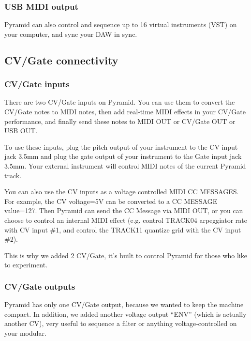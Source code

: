 \subsubsection{USB MIDI output}


Pyramid can also control and sequence up to 16 virtual instruments (VST) on your computer, and sync your DAW in sync.


\subsection{CV/Gate connectivity}

\subsubsection{CV/Gate inputs}


There are two CV/Gate inputs on Pyramid. You can use them to convert the CV/Gate notes to MIDI notes, then add real-time MIDI effects in your CV/Gate performance, and finally send these notes to MIDI OUT or CV/Gate OUT or USB OUT.

To use these inputs, plug the pitch output of your instrument to the CV input jack 3.5mm and plug the gate output of your instrument to the Gate input jack 3.5mm. Your external instrument will control MIDI notes of the current Pyramid track.

You can also use the CV inputs as a voltage controlled MIDI CC MESSAGES. For example, the CV voltage=5V can be converted to a CC MESSAGE value=127. Then Pyramid can send the CC Message via MIDI OUT, or you can choose to control an internal MIDI effect (e.g. control TRACK04 arpeggiator rate with CV input \#1, and control the TRACK11 quantize grid with the CV input \#2).

This is why we added 2 CV/Gate, it's built to control Pyramid for those who like to experiment.

\subsubsection{CV/Gate outputs}


Pyramid has only one CV/Gate output, because we wanted to keep the machine compact. In addition, we added another voltage output ``ENV'' (which is actually another CV), very useful to sequence a filter or anything voltage-controlled on your modular.


